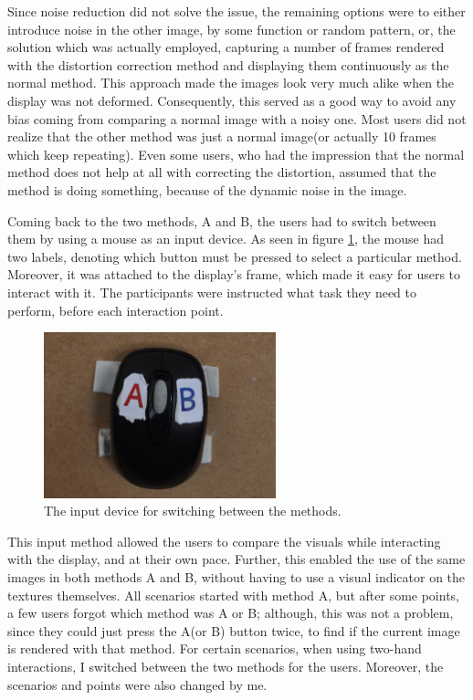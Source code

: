 \documentclass[]{article}
\begin{document}
Since noise reduction did not solve the issue, the remaining options were to either introduce noise in the other image, by some function or random pattern, or, the solution which was actually employed, capturing a number of frames rendered with the distortion correction method and displaying them continuously as the normal method. This approach made the images look very much alike when the display was not deformed. Consequently, this served as a good way to avoid any bias coming from comparing a normal image with a noisy one. Most users did not realize that the other method was just a normal image(or actually 10 frames which keep repeating). Even some users, who had the impression that the normal method does not help at all with correcting the distortion, assumed that the method is doing something, because of the dynamic noise in the image.

Coming back to the two methods, A and B, the users had to switch between them by using a mouse as an input device. As seen in figure \ref{fig:Mouse}, the mouse had two labels, denoting which button must be pressed to select a particular method. Moreover, it was attached to the display's frame, which made it easy for users to interact with it. The participants were instructed what task they need to perform, before each interaction point. 

\begin{figure}[!hbtp]
    \centering
    \includegraphics[width=0.6\textwidth]{figures/UserStudyMouseInput.JPG}
    \caption{The input device for switching between the methods.}
    \label{fig:Mouse}
\end{figure}

This input method allowed the users to compare the visuals while interacting with the display, and at their own pace. Further, this enabled the use of the same images in both methods A and B, without having to use a visual indicator on the textures themselves. All scenarios started with method A, but after some points, a few users forgot which method was A or B; although,  this was not a problem, since they could just press the A(or B) button twice, to find if the current image is rendered with that method. For certain scenarios, when using two-hand interactions, I switched between the two methods for the users. Moreover, the scenarios and points were also changed by me. 
\end{document}
